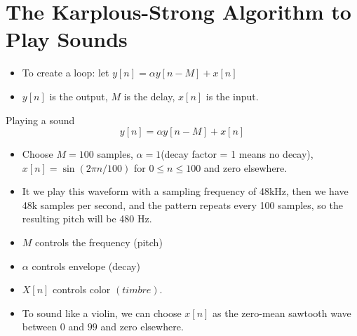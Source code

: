 \documentclass[../main.tex]{subfiles}
\begin{document}
\section{The Karplous-Strong Algorithm to Play Sounds}
\begin{itemize}
    \item To create a loop: let $y[n]=\alpha y[n-M]+x[n]$
    \item $y[n]$ is the output, $M$ is the delay, $x[n]$ is the input.
\end{itemize}
\begin{pbox}{Playing a sound}
    \[
    y[n]=\alpha y[n-M]+x[n]
    \]
    \begin{itemize}
        \item Choose $M=100$ samples, $\alpha = 1$(decay factor = 1 means no decay), $x[n]=\sin(2\pi n/100)$ for $0\leq n\leq 100$ and zero elsewhere.
        \item It we play this waveform with a sampling frequency of 48kHz, then we have 48k samples per second, and the pattern repeats every 100 samples, so the resulting pitch will be 480 Hz.
        \item $M$ controls the frequency (pitch)
        \item $\alpha$ controls envelope (decay)
        \item $X[n]$ controls color $(timbre)$.
        \item To sound like a violin, we can choose $x[n]$ as the zero-mean sawtooth wave between $0$ and $99$ and zero elsewhere.
    \end{itemize}
\end{pbox}
\end{document}

